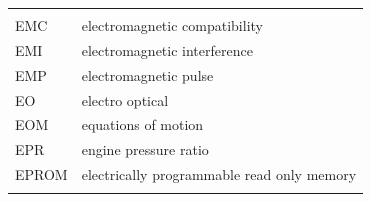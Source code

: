 \documentclass[
]{book}
\begin{document}
\begin{longtable}[]{@{}ll@{}}
\begin{minipage}[t]{0.47\columnwidth}
\end{minipage}\tabularnewline
\begin{minipage}[t]{0.47\columnwidth}\raggedright
EMC\strut
\end{minipage} & \begin{minipage}[t]{0.47\columnwidth}\raggedright
electromagnetic compatibility\strut
\end{minipage}\tabularnewline
\begin{minipage}[t]{0.47\columnwidth}\raggedright
EMI\strut
\end{minipage} & \begin{minipage}[t]{0.47\columnwidth}\raggedright
electromagnetic interference\strut
\end{minipage}\tabularnewline
\begin{minipage}[t]{0.47\columnwidth}\raggedright
EMP\strut
\end{minipage} & \begin{minipage}[t]{0.47\columnwidth}\raggedright
electromagnetic pulse\strut
\end{minipage}\tabularnewline
\begin{minipage}[t]{0.47\columnwidth}\raggedright
EO\strut
\end{minipage} & \begin{minipage}[t]{0.47\columnwidth}\raggedright
electro optical\strut
\end{minipage}\tabularnewline
\begin{minipage}[t]{0.47\columnwidth}\raggedright
EOM\strut
\end{minipage} & \begin{minipage}[t]{0.47\columnwidth}\raggedright
equations of motion\strut
\end{minipage}\tabularnewline
\begin{minipage}[t]{0.47\columnwidth}\raggedright
EPR\strut
\end{minipage} & \begin{minipage}[t]{0.47\columnwidth}\raggedright
engine pressure ratio\strut
\end{minipage}\tabularnewline
\begin{minipage}[t]{0.47\columnwidth}\raggedright
EPROM\strut
\end{minipage} & \begin{minipage}[t]{0.47\columnwidth}\raggedright
electrically programmable read only memory\strut
\end{minipage}\tabularnewline
\begin{minipage}[t]{0.47\columnwidth}\raggedright

\end{minipage}
\end{longtable}
\end{document}
